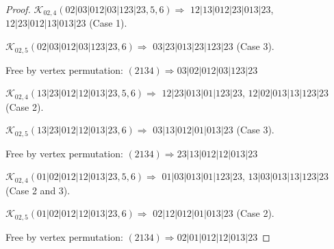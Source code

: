 \documentclass[12pt]{article}
\theoremstyle{plain}
\theoremstyle{definition}
\theoremstyle{remark}
\newcommand{\fancy}[1]{\mathcal{#1}}
\def\K{\fancy{K}}
\begin{document}
\begin{proof}
	$\K_{02,4}(02|03|012|03|123|23,5, 6)\Rightarrow $ $12|13|012|23|013|23$, $12|23|012|13|013|23$ (Case 1).
	
	$\K_{02,5}(02|03|012|03|123|23,6)\Rightarrow $ $03|23|013|23|123|23$ (Case 3).
	
	
	
	Free by vertex permutation: $(2 1 3 4)\Rightarrow 03|02|012|03|123|23$
	
	
	
	\bigskip
	
	$\K_{02,4}(13|23|012|12|013|23,5, 6)\Rightarrow $ $12|23|013|01|123|23$, $12|02|013|13|123|23$ (Case 2).
	
	$\K_{02,5}(13|23|012|12|013|23,6)\Rightarrow $ $03|13|012|01|013|23$ (Case 3).
	
	
	
	Free by vertex permutation: $(2 1 3 4)\Rightarrow 23|13|012|12|013|23$
	
	
	
	\bigskip
	
	$\K_{02,4}(01|02|012|12|013|23,5, 6)\Rightarrow $ $01|03|013|01|123|23$, $13|03|013|13|123|23$ (Case 2 and 3).
	
	$\K_{02,5}(01|02|012|12|013|23,6)\Rightarrow $ $02|12|012|01|013|23$ (Case 2).
	
	
	
	Free by vertex permutation: $(2 1 3 4)\Rightarrow 02|01|012|12|013|23$
	
	
	
	\bigskip
	
\end{proof}
\end{document}
